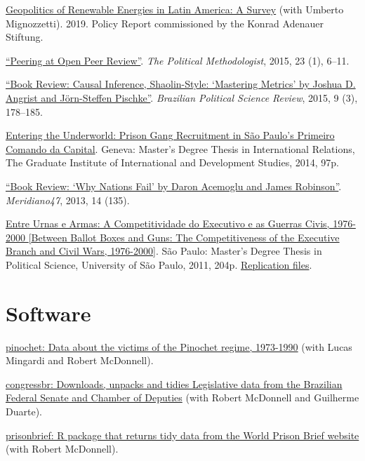 \documentclass[a4paper]{article}
\renewenvironment{itemize}{
	\begin{list}{}{
			\setlength{\leftmargin}{1.5em}
		}
		}{
	\end{list}
}
\begin{document}
\begin{itemize}
\item \href{https://www.kas.de/documents/273477/273526/Geopolitics+of+Renewable+Energy+in+Latin+America+-+A+Survey.pdf/9fe39ef1-6028-0836-90b0-aada31cb6769?version=1.0&t=1551887777018}{Geopolitics of Renewable Energies in Latin America: A Survey} (with Umberto Mignozzetti). 2019. Policy Report commissioned by the Konrad Adenauer Stiftung.
\item \href{https://thepoliticalmethodologist.files.wordpress.com/2016/02/tpm_v23_n1.pdf}{``Peering at Open Peer Review''}. \textit{The Political Methodologist}, 2015, 23 (1), 6--11.
\item \href{http://www.scielo.br/readcube/epdf.php?doi=10.1590/1981-38212015000300026&pid=S1981-38212015000300178&pdf_path=bpsr/v9n3/1981-3821-bpsr-9-3-0178.pdf&lang=en}{``Book Review: Causal Inference, Shaolin-Style: `Mastering Metrics' by Joshua D. Angrist and J\"{o}rn-Steffen Pischke''}. \textit{Brazilian Political Science Review}, 2015, 9 (3), 178--185.
\item \href{http://dx.doi.org/10.6084/m9.figshare.1209203}{Entering the Underworld: Prison Gang Recruitment in S\~{a}o Paulo's Primeiro Comando da Capital}. Geneva: Master's Degree Thesis in International Relations, The Graduate Institute of International and Development Studies, 2014, 97p.
\item \href{http://seer.bce.unb.br/index.php/MED/article/view/7505/6497}{``Book Review: `Why Nations Fail' by Daron Acemoglu and James Robinson''}. \textit{Meridiano47}, 2013, 14 (135).
\item \href{http://dx.doi.org/10.6084/m9.figshare.963082}{Entre Urnas e Armas: A Competitividade do Executivo e as Guerras Civis, 1976-2000 {[}Between Ballot Boxes and Guns: The Competitiveness of the Executive Branch and Civil Wars, 1976-2000{]}}. S\~{a}o Paulo: Master's Degree Thesis in Political Science, University of S\~{a}o Paulo, 2011, 204p. \href{http://dx.doi.org/10.6084/m9.figshare.963183}{Replication files}.
\end{itemize}

\section*{Software}

\begin{itemize}
  \item \href{http://danilofreire.github.io/pinochet}{pinochet: Data about the victims of the Pinochet regime, 1973-1990} (with Lucas Mingardi and Robert McDonnell).
  \item \href{https://github.com/RobertMyles/congressbr}{congressbr: Downloads, unpacks and tidies Legislative data from the Brazilian Federal Senate and Chamber of Deputies} (with Robert McDonnell and Guilherme Duarte).
  \item \href{http://danilofreire.github.io/prisonbrief}{prisonbrief: R package that returns tidy data from the World Prison Brief website} (with Robert McDonnell).
\end{itemize}
\end{document}
